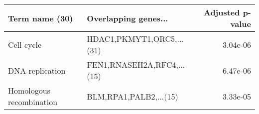 \begin{tabular}{llr}
\toprule
          Term name (30) &       Overlapping genes... &  Adjusted p-value \\
\midrule
              Cell cycle &  HDAC1,PKMYT1,ORC5,...(31) &          3.04e-06 \\
         DNA replication & FEN1,RNASEH2A,RFC4,...(15) &          6.47e-06 \\
Homologous recombination &     BLM,RPA1,PALB2,...(15) &          3.33e-05 \\
\bottomrule
\end{tabular}
